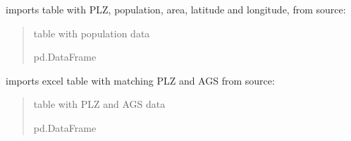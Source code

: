\documentclass[letterpaper,10pt,english]{sphinxmanual}
\begin{document}
\begin{fulllineitems}
\label{\detokenize{docs_pylovo/municipal_register/municipal_register:municipal_register.gemeindeverzeichnis.import_functions.import_plz_einwohner}}
\pysigstartsignatures
{}
\pysigstopsignatures
\sphinxAtStartPar
imports table with PLZ, population, area, latitude and longitude,
from source: 
\begin{quote}\begin{description}
\sphinxAtStartPar
table with population data

\sphinxAtStartPar
pd.DataFrame

\end{description}\end{quote}

\end{fulllineitems}


\begin{fulllineitems}
\label{\detokenize{docs_pylovo/municipal_register/municipal_register:municipal_register.gemeindeverzeichnis.import_functions.import_zuordnung_plz}}
\pysigstartsignatures
{}
\pysigstopsignatures
\sphinxAtStartPar
imports excel table with matching PLZ and AGS
from source: 
\begin{quote}\begin{description}
\sphinxAtStartPar
table with PLZ and AGS data

\sphinxAtStartPar
pd.DataFrame

\end{description}\end{quote}

\end{fulllineitems}
\end{document}
